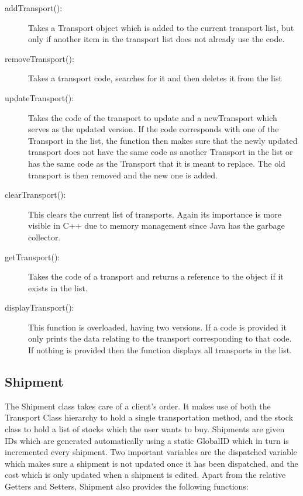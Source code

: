 \documentclass[12pt, a4paper]{report}
\begin{document}
\begin{description}
   \item [addTransport():] Takes a Transport object which is added to the current transport list, but only if another item in the transport list does not already use the code.
   \item[removeTransport():] Takes a transport code, searches for it and then deletes it from the list 
   \item[updateTransport():] Takes the code of the transport to update and a newTransport which serves as the updated version. If the code corresponds with one of the Transport in the list, the function then makes sure that the newly updated transport does not have the same code as another Transport in the list or has the same code as the Transport that it is meant to replace. The old transport is then removed and the new one is added.
   \item[clearTransport():] This clears the current list of transports. Again its importance is more visible in C++ due to memory management since Java has the garbage collector. 
   \item[getTransport():] Takes the code of a transport and returns a reference to the object if it exists in the list.
   \item[displayTransport():]This function is overloaded, having two versions. If a code is provided it only prints the data relating to the transport corresponding to that code. If nothing is provided then the function displays all transports in the list.
\end{description}

\subsection{Shipment}
The Shipment class takes care of a client's order. It makes use of both the Transport Class hierarchy to hold a single transportation method, and the stock class to hold a list of stocks which the user wants to buy. Shipments are given IDs which are generated automatically using a static GlobalID which in turn is incremented every shipment. Two important variables are the dispatched variable which makes sure a shipment is not updated once it has been dispatched, and the cost which is only updated when a shipment is edited. Apart from the relative Getters and Setters, Shipment also provides the following functions:
\end{document}
